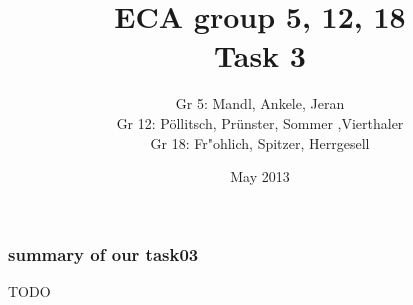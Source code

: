 \documentclass{beamer}
\title{ECA group 5, 12, 18 \\ Task 3}
\author{\small{Gr 5: Mandl, Ankele, Jeran\\Gr 12: P\"ollitsch, Pr\"unster, Sommer ,Vierthaler\\Gr 18: Fr"ohlich, Spitzer, Herrgesell}}
\date{May 2013}
\begin{document}
\begin{frame}[plain]
	\titlepage
\end{frame}

\begin{frame}
\frametitle{summary of our task03}
TODO

\end{frame}
\end{document}
